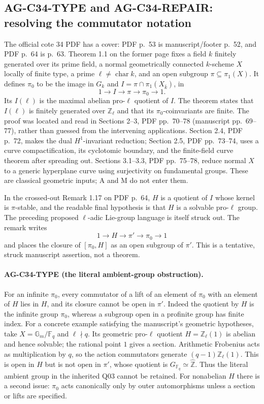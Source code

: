 \subsection{AG-C34-TYPE and AG-C34-REPAIR: resolving the commutator notation}
\label{ag:c34repair}

The official cote 34 PDF has a cover: PDF p.~53 is manuscript/footer
p.~52, and PDF p.~64 is p.~63. Theorem 1.1 on the former page fixes a
field $k$ finitely generated over its prime field, a normal geometrically
connected $k$-scheme $X$ locally of finite type, a prime
$\ell\ne\operatorname{char}k$, and an open subgroup
$\pi\subseteq\pi_1(X)$. It defines $\pi_0$ to be the image in
$G_k$ and $I=\pi\cap\pi_1(X_{\bar k})$, in
\[
 1\longrightarrow I\longrightarrow\pi\longrightarrow\pi_0
 \longrightarrow1.
\]
Its $I(\ell)$ is the maximal abelian pro-$\ell$ quotient of $I$.
The theorem states that $I(\ell)$ is finitely generated over
$\mathbb Z_\ell$ and that its $\pi_0$-coinvariants are finite.
The proof was located and read in Sections 2--3, PDF pp.~70--78
(manuscript pp.~69--77), rather than guessed from the intervening
applications. Section 2.4, PDF p.~72, makes the dual $H^1$-invariant
reduction; Section 2.5, PDF pp.~73--74, uses a curve compactification,
its cyclotomic boundary, and the finite-field curve theorem after
spreading out. Sections 3.1--3.3, PDF pp.~75--78, reduce normal $X$ to
a generic hyperplane curve using surjectivity on fundamental groups.
These are classical geometric inputs; A and M do not enter them.

In the crossed-out Remark 1.17 on PDF p.~64, $H$ is a quotient of $I$
whose kernel is $\pi$-stable, and the readable final hypothesis is that
$H$ is a solvable pro-$\ell$ group. The preceding proposed
$\ell$-adic Lie-group language is itself struck out. The remark writes
\[
 1\longrightarrow H\longrightarrow\pi'\longrightarrow\pi_0
 \longrightarrow1
\]
and places the closure of $[\pi_0,H]$ as an open subgroup of $\pi'$.
This is a tentative, struck manuscript assertion, not a theorem.

\paragraph{AG-C34-TYPE (the literal ambient-group obstruction).}
For an infinite $\pi_0$, every commutator of a lift of an element of
$\pi_0$ with an element of $H$ lies in $H$, and its closure cannot be
open in $\pi'$. Indeed the quotient by $H$ is the infinite group
$\pi_0$, whereas a subgroup open in a profinite group has finite index.
For a concrete example satisfying the manuscript's geometric hypotheses,
take $X=\mathbb G_m/\mathbb F_q$ and $\ell\nmid q$. Its geometric
pro-$\ell$ quotient $H=\mathbb Z_\ell(1)$ is abelian and hence
solvable; the rational point $1$ gives a section. Arithmetic Frobenius
acts as multiplication by $q$, so the action commutators generate
$(q-1)\mathbb Z_\ell(1)$. This is open in $H$ but is not open in
$\pi'$, whose quotient is $G_{\mathbb F_q}\simeq\widehat{\mathbb Z}$.
Thus the literal ambient group in the inherited Q03 cannot be retained.
For nonabelian $H$ there is a second issue: $\pi_0$ acts canonically
only by outer automorphisms unless a section or lifts are specified.

